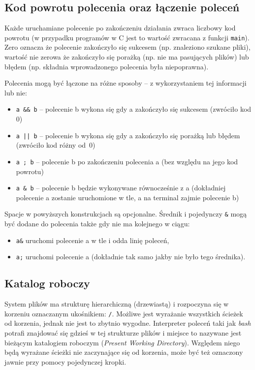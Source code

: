 \subsection{Kod powrotu polecenia oraz łączenie poleceń}

Każde uruchamiane polecenie po zakończeniu działania zwraca liczbowy kod powrotu (w przypadku programów w C jest to wartość zwracana z funkcji \Verb$main$).
Zero oznacza że polecenie zakończyło się sukcesem (np. znaleziono szukane pliki), wartość nie zerowa że zakończyło się porażką (np. nie ma pasujących plików) lub błędem (np. składnia wprowadzonego polecenia była niepoprawna).

Polecenia mogą być łączone na różne sposoby – z wykorzystaniem tej informacji lub nie:
\begin{itemize}
	\item \Verb$a && b$ – polecenie b wykona się gdy a zakończyło się sukcesem (zwróciło kod 0)
	\item \Verb$a || b$ – polecenie b wykona się gdy a zakończyło się porażką lub błędem (zwróciło kod różny od~0)
	\item \Verb$a ; b$ – polecenie b po zakończeniu polecenia a (bez względu na jego kod powrotu)
	\item \Verb$a & b$ – polecenie b będzie wykonywane równocześnie z a (dokładniej polecenie a zostanie uruchomione w tle, a na terminal zajmie polecenie b)
\end{itemize}

Spacje w powyższych konstrukcjach są opcjonalne.
Średnik i pojedynczy \Verb$&$ mogą być dodane do polecenia także gdy nie ma kolejnego w ciągu:
\begin{itemize}
	\item \Verb$a&$ uruchomi polecenie a w tle i odda linię poleceń,
	\item \Verb$a;$ uruchomi polecenie a (dokładnie tak samo jakby nie było tego średnika).
\end{itemize}

\subsection{Katalog roboczy}

System plików ma strukturę hierarchiczną (drzewiastą) i rozpoczyna się w korzeniu oznaczanym ukośnikiem: \texttt{/}.
Możliwe jest wyrażanie wszystkich ścieżek od korzenia, jednak nie jest to zbytnio wygodne.
Interpreter poleceń taki jak \textit{bash} potrafi znajdować się gdzieś w tej strukturze plików i miejsce to nazywane jest bieżącym katalogiem roboczym (\textit{Present Working Directory}).
Względem niego będą wyrażane ścieżki nie zaczynające się od korzenia, może być też oznaczony jawnie przy pomocy pojedynczej kropki.

